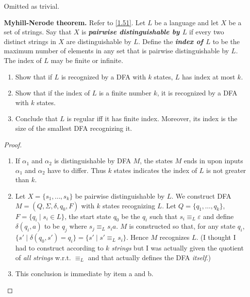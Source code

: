 Omitted as trivial.

\begin{exercise}
  \textbf{Myhill-Nerode theorem.} Refer to \ref{1.51}. Let $L$ be a language and let $X$ be a set of strings. Say that $X$ is \textbf{\textit{pairwise distinguishable by $L$}} if every two distinct strings in $X$ are distinguishable by $L$. Define the \textbf{\textit{index of $L$}} to be the maximum number of elements in any set that is pairwise distinguishable by $L$. The index of $L$ may be finite or infinite.

  \begin{enumerate}[label=\textbf{\alph*.}]
    \item Show that if $L$ is recognized by a DFA with $k$ states, $L$ has index at most $k$.
    \item Show that if the index of $L$ is a finite number $k$, it is recognized by a DFA with $k$ states.
    \item Conclude that $L$ is regular iff it has finite index. Moreover, its index is the size of the smallest DFA recognizing it.\qedhere
  \end{enumerate}
\end{exercise}

\begin{proof}
  \begin{enumerate}[label=\textbf{\alph*.}]
    \item If $\alpha_1$ and $\alpha_2$ is distinguishable by DFA $M$, the states $M$ ends in upon inputs $\alpha_1$ and $\alpha_2$ have to differ. Thus $k$ states indicates the index of $L$ is not greater than $k$.
    \item Let $X = \{s_1, \dots, s_k\}$ be pairwise distinguishable by $L$. We construct DFA $M = (Q, \Sigma, \delta, q_0, F)$ with $k$ states recognizing $L$. Let $Q = \{q_1, \dots, q_k\}$, $F = \{q_i \mid s_i \in L\}$, the start state $q_0$ be the $q_i$ such that $s_i \equiv_L \varepsilon$ and define $\delta(q_i,a)$ to be $q_j$ where $s_j\equiv_L s_ia$. $M$ is constructed so that, for any state $q_i$, $\{s' \mid \delta(q_0, s') = q_i\} = \{s' \mid s' \equiv_L s_i\}$. Hence $M$ recognizes $L$. (I thought I had to construct according to $k$ \textit{strings} but I was actually given the quotient of \textit{all strings} w.r.t. $\equiv_L$ and that actually defines the DFA \textit{itself}.)
    \item This conclusion is immediate by item a and b.\qedhere
  \end{enumerate}
\end{proof}

